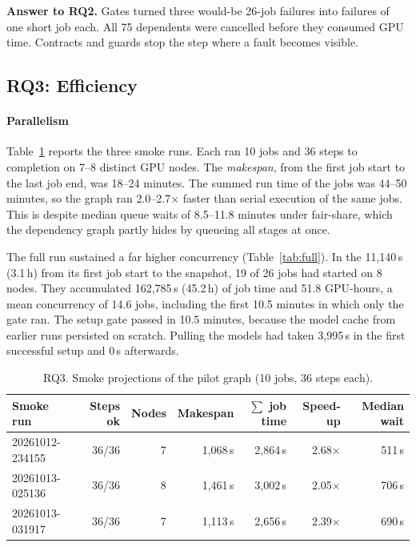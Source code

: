 \documentclass[pdflatex,sn-mathphys-num]{sn-jnl}
\theoremstyle{thmstyleone}%
\theoremstyle{thmstyletwo}%
\theoremstyle{thmstylethree}%
\begin{document}
\begin{tcolorbox}[enhanced, colback=modelbg, colframe=modelbar, boxrule=0.5pt, arc=1pt, left=6pt, right=6pt, top=3pt, bottom=3pt]
\small\textbf{Answer to RQ2.} Gates turned three would-be 26-job failures into
failures of one short job each. All 75 dependents were cancelled before they
consumed GPU time. Contracts and guards stop the step where a fault becomes
visible.
\end{tcolorbox}

\subsection{RQ3: Efficiency}\label{sec:res-rq3}

\paragraph{Parallelism} Table~\ref{tab:smoke} reports the three smoke runs.
Each ran 10 jobs and 36 steps to completion on 7--8 distinct GPU nodes. The
\emph{makespan}, from the first job start to the last job end, was 18--24
minutes. The summed run time of the jobs was 44--50 minutes, so the graph ran
2.0--2.7$\times$ faster than serial execution of the same jobs. This is despite
median queue waits of 8.5--11.8 minutes under fair-share, which the dependency
graph partly hides by queueing all stages at once.

The full run sustained a far higher concurrency (Table~\ref{tab:full}). In
the 11{,}140\,s (3.1\,h) from its first job start to the snapshot, 19 of 26 jobs
had started on 8 nodes. They accumulated 162{,}785\,s (45.2\,h) of job time
and 51.8 GPU-hours, a mean concurrency of 14.6 jobs, including the first
10.5 minutes in which only the gate ran. The setup gate passed in 10.5 minutes, because the
model cache from earlier runs persisted on scratch. Pulling the models had
taken 3{,}995\,s in the first successful setup and 0\,s afterwards.

\begin{table}[t]
\centering\small
\caption{RQ3. Smoke projections of the pilot graph (10 jobs, 36 steps each).}\label{tab:smoke}
\begin{tabular}{@{}l r r r r r r@{}}
\toprule
Smoke run & Steps ok & Nodes & Makespan & $\sum$ job time & Speed-up & Median wait \\
\midrule
20261012-234155 & 36/36 & 7 & 1{,}068\,s & 2{,}864\,s & 2.68$\times$ & 511\,s \\
20261013-025136 & 36/36 & 8 & 1{,}461\,s & 3{,}002\,s & 2.05$\times$ & 706\,s \\
20261013-031917 & 36/36 & 7 & 1{,}113\,s & 2{,}656\,s & 2.39$\times$ & 690\,s \\
\bottomrule
\end{tabular}
\end{table}
\end{document}
